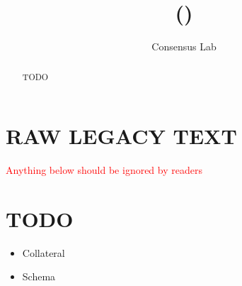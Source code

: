 \documentclass[11pt,a4paper]{article}
\begin{document}
\title{\nameFull (\nameAbbr)}
\date{}
\author{Consensus Lab}

\maketitle
\begin{abstract}
TODO
\end{abstract}









 
\newpage
\section{RAW LEGACY TEXT}
\textcolor{red}{Anything below should be ignored by readers}
\newpage
\section{TODO}
\begin{itemize}
    \item Collateral
    \item Schema
\end{itemize}




\newpage


% 
% 
% 
% 
\end{document}
